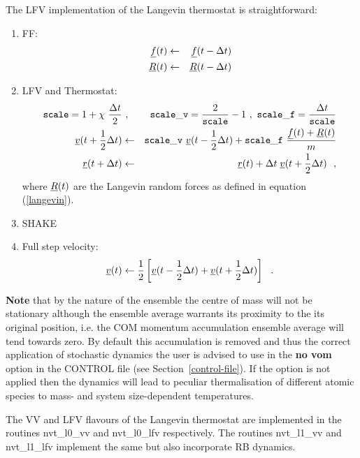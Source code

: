 The LFV implementation of the Langevin thermostat is straightforward:
\begin{enumerate}
\item FF:
\begin{eqnarray}
\mbox{$\underline{f}$}(t) &\leftarrow& \mbox{$\underline{f}$}(t - \Delta t) \nonumber \\
\mbox{$\underline{R}$}(t) &\leftarrow& \mbox{$\underline{R}$}(t - \Delta t) \\
\end{eqnarray}
\item LFV and Thermostat:
\begin{eqnarray}
{\tt scale} = 1 + \chi~\frac{\Delta t}{2} &~,~&
{\tt scale\_v} = \frac{2}{\tt scale}-1 ~,~
{\tt scale\_f} = \frac{\Delta t}{\tt scale} \nonumber \\
\mbox{$\underline{v}$}(t + {1 \over 2} \Delta t) &\leftarrow&
{\tt scale\_v}~\mbox{$\underline{v}$}(t - {1 \over 2} \Delta t) +
{\tt scale\_f}~\frac{\mbox{$\underline{f}$}(t) + \mbox{$\underline{R}$}(t)}{m} \\
\mbox{$\underline{r}$}(t + \Delta t) &\leftarrow& \mbox{$\underline{r}$}(t) + \Delta t \;
\mbox{$\underline{v}$}(t + {1 \over 2} \Delta t)~~, \nonumber
\end{eqnarray}
where $\mbox{$\underline{R}$}(t)$ are the Langevin random forces as defined in equation (\ref{langevin}).
\item SHAKE
\item Full step velocity:
\begin{equation}
\mbox{$\underline{v}$}(t) \leftarrow {1 \over 2} \left[ \mbox{$\underline{v}$}(t - {1 \over 2} \Delta t) +
\mbox{$\underline{v}$}(t + {1 \over 2} \Delta t) \right]~~.
\end{equation}
\end{enumerate}

{\bf Note} that by the nature of the ensemble the centre of mass will
not be stationary although the ensemble average warrants its proximity
to the its original position, i.e. the COM momentum accumulation ensemble
average will tend towards zero.  By default this accumulation is removed
and thus the correct application of stochastic dynamics the user is
advised to use in the {\bf no vom} option in the CONTROL file (see
Section~\ref{control-file}).  If the option is not applied then the
dynamics will lead to peculiar thermalisation of different atomic
species to mass- and system size-dependent temperatures.

The VV and LFV flavours of the Langevin thermostat are implemented in
the \D routines {\sc nvt\_l0\_vv} and {\sc nvt\_l0\_lfv} respectively.
The routines {\sc nvt\_l1\_vv} and {\sc nvt\_l1\_lfv} implement the
same but also incorporate RB dynamics.

